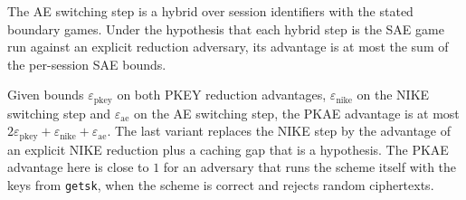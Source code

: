 \begin{theorem}
  \label{thm:cryptobox-ae}
  \leanok
  The AE switching step is a hybrid over session identifiers with the stated
  boundary games. Under the hypothesis that each hybrid step is the SAE game run
  against an explicit reduction adversary, its advantage is at most the sum of
  the per-session SAE bounds.
\end{theorem}

\begin{theorem}
  \label{thm:cryptobox}
  \leanok
  Given bounds $\varepsilon_{\mathrm{pkey}}$ on both PKEY reduction advantages,
  $\varepsilon_{\mathrm{nike}}$ on the NIKE switching step and
  $\varepsilon_{\mathrm{ae}}$ on the AE switching step, the PKAE advantage is at
  most $2\varepsilon_{\mathrm{pkey}} + \varepsilon_{\mathrm{nike}} +
  \varepsilon_{\mathrm{ae}}$. The last variant replaces the NIKE step by the
  advantage of an explicit NIKE reduction plus a caching gap that is a
  hypothesis. The PKAE advantage here is close to $1$ for an adversary that runs
  the scheme itself with the keys from \texttt{getsk}, when the scheme is correct
  and rejects random ciphertexts.
\end{theorem}
